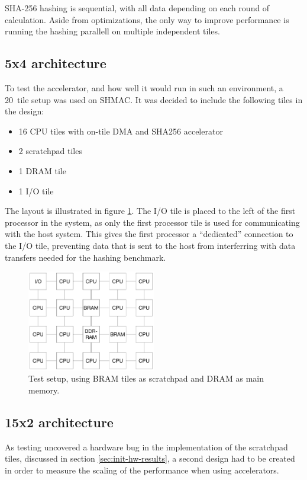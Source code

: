 SHA-256 hashing is sequential, with all data depending on each round of calculation.
Aside from optimizations, the only way to improve performance is running the hashing parallell on multiple independent tiles.

\subsection{5x4 architecture}
To test the accelerator, and how well it would run in such an environment, a 20~tile setup was used on SHMAC. It was decided to include the following tiles in the design:

\begin{itemize}
    \item 16 CPU tiles with on-tile DMA and SHA256 accelerator
    \item 2 scratchpad tiles
    \item 1 DRAM tile
    \item 1 I/O tile
\end{itemize}

The layout is illustrated in figure \ref{fig:5x4}. The I/O tile is placed to the
left of the first processor in the system, as only the first processor tile is used
for communicating with the host system. This gives the first processor a ``dedicated''
connection to the I/O tile, preventing data that is sent to the host from interferring
with data transfers needed for the hashing benchmark.

\begin{figure}[htb]
    \centering
    \includegraphics[width=0.5\textwidth]{Figures/Measurements/5x4}
    \caption{Test setup, using BRAM tiles as scratchpad and DRAM as main memory.}
    \label{fig:5x4}
\end{figure}

\subsection{15x2 architecture}
As testing uncovered a hardware bug in the implementation of the scratchpad tiles,
discussed in section \ref{sec:init-hw-results}, a second design had to be created
in order to measure the scaling of the performance when using accelerators.


